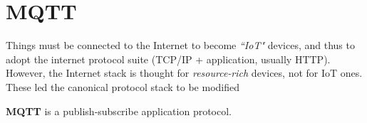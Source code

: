 \chapter{MQTT}
Things must be connected to the Internet to become
\textit{``IoT"} devices, and thus to adopt the internet
protocol suite (TCP/IP + application, usually HTTP).
However, the Internet stack is thought for \textit{resource-rich} devices, not for IoT ones.\\
These led the canonical protocol stack to be modified 

\textbf{MQTT} is a publish-subscribe application protocol.